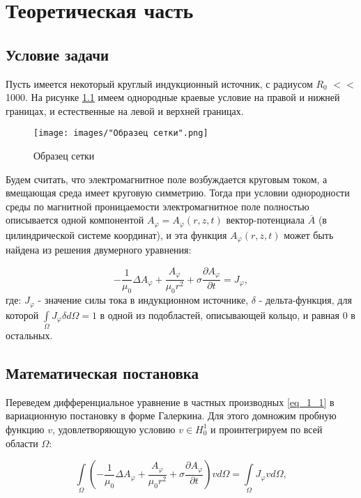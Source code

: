 \chapter{Теоретическая часть}

\section{Условие задачи}

Пусть имеется некоторый круглый индукционный источник, с радиусом $R_0$ $<<$ 1000. На рисунке \ref{fig:areaExample} имеем однородные краевые условие на правой и нижней границах, и естественные на левой и верхней границах.

\begin{figure}
	\centering
	\texttt{[image: images/"Образец сетки".png]}
	\caption{Образец сетки}
	\label{fig:areaExample}
\end{figure}

Будем считать, что электромагнитное поле возбуждается круговым током, а вмещающая среда имеет круговую симметрию. Тогда при условии однородности среды по магнитной проницаемости электромагнитное поле полностью описывается одной компонентой $A_{\varphi} = A_{\varphi}(r, z, t)$ вектор-потенциала $\overline{A}$ (в цилиндрической системе координат), и эта функция $A_{\varphi}(r, z, t)$ может быть найдена из решения двумерного уравнения:

\begin{equation} \label{eq_1_1}
	-\frac{1}{\mu_0} \Delta A_{\varphi} + \frac{A_{\varphi}}{\mu_0 r^2} + \sigma \frac{\partial A_{\varphi}}{\partial t} = J_{\varphi},
\end{equation}
где: $J_{\varphi}$ - значение силы тока в индукционном источнике, $\delta$ - дельта-функция, для которой $\int \limits_{\Omega} J_{\varphi} \delta d \Omega = 1$ в одной из подобластей, описывающей кольцо, и равная 0 в остальных.

\section{Математическая постановка}

Переведем дифференциальное уравнение в частных производных \ref{eq_1_1} в вариационную постановку в форме Галеркина. Для этого домножим пробную функцию $v$, удовлетворяющую условию $v \in H^1_0$ и проинтегрируем по всей области $\Omega$:

\begin{equation} \label{eq_1_2}
	\int \limits_{\Omega} \left(-\frac{1}{\mu_0} \Delta {A_{\varphi}} + \frac{A_{\varphi}}{\mu_0 r^2} + \sigma \frac{\partial A_{\varphi}}{\partial t}\right) v d \Omega = \int \limits_{\Omega} J_{\varphi} v d \Omega,
\end{equation}

